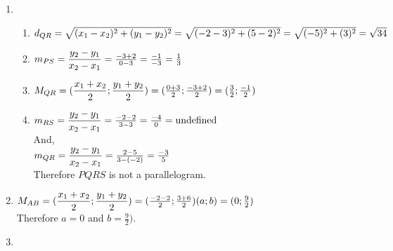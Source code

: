 \begin{exercises}{}
{\begin{enumerate}[itemsep=5pt, label=\textbf{\arabic*}. ]
\begin{eocsolutions}{}
{\begin{enumerate}[itemsep=5pt, label=\textbf{\arabic*}. ]
Solve for $x$: \\
  $\frac{1}{2} = \frac{-2+x}{2} \\ 
  1 = -2+x\\ 
  x = 3 \\ $
Solve for $y$: \\
  $1 = \frac{-1+y}{2} \\ 
  2 = -1+y \\ 
  y = 3 \\ $
Therefore $H(3;3)$ \\
\item  %
\begin{enumerate}[itemsep=5pt, label=\textbf{(\alph*)} ] 
\item
$d_{QR} = \sqrt{(x_1-x_2)^2+(y_1-y_2)^2}\\
    = \sqrt{(-2-3)^2+(5-2)^2}\\
    = \sqrt{(-5)^2+(3)^2}\\
    = \sqrt{34}$
\item
$m_{PS} = \dfrac{y_2-y_1}{x_2-x_1}\\
    = \frac{-3+2}{0-3}\\
    = \frac{-1}{-3}\\
    = \frac{1}{3}$
\item
$M_{QR} = (\dfrac{x_1+x_2}{2};\dfrac{y_1+y_2}{2})\\
    = (\frac{0+3}{2};\frac{-3+2}{2})\\
    = (\frac{3}{2};\frac{-1}{2})$
\item
$m_{RS} = \dfrac{y_2-y_1}{x_2-x_1}\\
    = \frac{-2-2}{3-3}\\
    = \frac{-4}{0}\\
    = \mbox{undefined}$\\
And, \\
$m_{QR} = \dfrac{y_2-y_1}{x_2-x_1}\\
    = \frac{2-5}{3-(-2)}\\
    = \frac{-3}{5}$\\
Therefore $PQRS$ is not a parallelogram.
\end{enumerate}
\item  %
$M_{AB} = (\dfrac{x_1+x_2}{2};\dfrac{y_1+y_2}{2})\\
	= (\frac{-2-2}{2};\frac{3+6}{2})\\
 (a;b) = (0;\frac{9}{2})$\\
Therefore $a=0$ and $b=\frac{9}{2})$.
\item  %
\begin{enumerate}[itemsep=5pt, label=\textbf{(\alph*)} ] 

\end{enumerate}
\end{enumerate}}
\end{eocsolutions}
\end{enumerate}}
\end{exercises}
